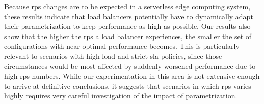 Because \gls{rps} changes are to be expected in a serverless edge computing system, these results indicate that load balancers potentially have to dynamically adapt their parametrization to keep performance as high as possible.
Our results also show that the higher the \gls{rps} a load balancer experiences, the smaller the set of configurations with near optimal performance becomes.
This is particularly relevant to scenarios with high load and strict \gls{sla} policies, since those circumstances would be most affected by suddenly worsened performance due to high \gls{rps} numbers.
While our experimentation in this area is not extensive enough to arrive at definitive conclusions, it suggests that scenarios in which \gls{rps} varies highly requires very careful investigation of the impact of parametrization.


